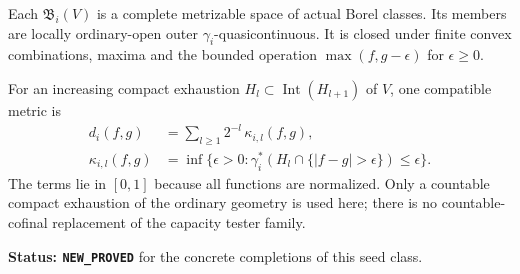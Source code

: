 \begin{theorem}
\label{thm:r12-band-completion-metric}
Each $\mathfrak B_i(V)$ is a complete metrizable space of actual
Borel classes. Its members are locally ordinary-open outer
$\gamma_i$-quasicontinuous. It is closed under finite convex
combinations, maxima and the bounded operation
$\max(f,g-\epsilon)$ for $\epsilon\geq0$.

For an increasing compact exhaustion
$H_l\subset\operatorname{Int}(H_{l+1})$ of $V$, one compatible
metric is
\[
 \begin{split}
 d_i(f,g)&=\sum_{l\geq1}2^{-l}\,\kappa_{i,l}(f,g),\\
 \kappa_{i,l}(f,g)&=\inf\{\epsilon>0:
  \gamma_i^*(H_l\cap\{|f-g|>\epsilon\})\leq\epsilon\}.
 \end{split}
 \tag{BC3}
\]
The terms lie in $[0,1]$ because all functions are normalized.
Only a countable compact exhaustion of the ordinary geometry is
used here; there is no countable-cofinal replacement of the
capacity tester family.
\end{theorem}

\noindent\textbf{Status: \texttt{NEW\_PROVED}} for the concrete
completions of this seed class.

